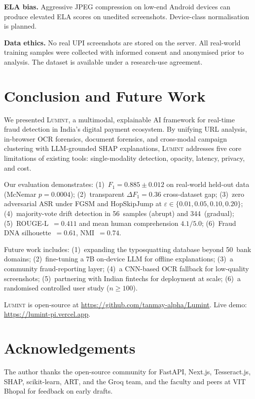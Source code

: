 \documentclass[conference]{IEEEtran}
\begin{document}
\textbf{ELA bias.}
Aggressive JPEG compression on low-end Android devices can produce
elevated ELA scores on unedited screenshots.
Device-class normalisation is planned.

\textbf{Data ethics.}
No real UPI screenshots are stored on the server.
All real-world training samples were collected with informed consent and
anonymised prior to analysis.
The dataset is available under a research-use agreement.

\section{Conclusion and Future Work}\label{sec:conclusion}

We presented \textsc{Lumint}, a multimodal, explainable AI framework for
real-time fraud detection in India's digital payment ecosystem.
By unifying URL analysis, in-browser OCR forensics, document forensics,
and cross-modal campaign clustering with LLM-grounded SHAP explanations,
\textsc{Lumint} addresses five core limitations of existing tools:
single-modality detection, opacity, latency, privacy, and cost.

Our evaluation demonstrates:
(1)~$F_1{=}0.885{\pm}0.012$ on real-world held-out data
    (McNemar $p{=}0.0004$);
(2)~transparent $\Delta F_1{=}0.36$ cross-dataset gap;
(3)~zero adversarial ASR under FGSM and HopSkipJump at
    $\varepsilon\!\in\!\{0.01,0.05,0.10,0.20\}$;
(4)~majority-vote drift detection in 56~samples (abrupt) and
    344~(gradual);
(5)~ROUGE-L~$=0.411$ and mean human comprehension $4.1/5.0$;
(6)~Fraud DNA silhouette~$=0.61$, NMI~$=0.74$.

Future work includes:
(1)~expanding the typosquatting database beyond 50~bank domains;
(2)~fine-tuning a 7B on-device LLM for offline explanations;
(3)~a community fraud-reporting layer;
(4)~a CNN-based OCR fallback for low-quality screenshots;
(5)~partnering with Indian fintechs for deployment at scale;
(6)~a randomised controlled user study ($n{\geq}100$).

\textsc{Lumint} is open-source at
\url{https://github.com/tanmay-alpha/Lumint}.
Live demo: \url{https://lumint-pi.vercel.app}.

\section*{Acknowledgements}
The author thanks the open-source community for FastAPI, Next.js,
Tesseract.js, SHAP, scikit-learn, ART, and the Groq team, and the
faculty and peers at VIT Bhopal for feedback on early drafts.
\end{document}
